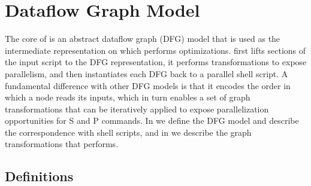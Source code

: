 \documentclass[letterpaper,twocolumn,10pt]{article}
\newcommand{\tcn}[1]{\mbox{\textcircled{\scriptsize #1}}}
\newcommand{\tsta}{\tcn{\textsc{S}}\xspace}
\newcommand{\tpur}{\tcn{\textsc{P}}\xspace}
\newcommand{\nv}[1]{[{\color{cyan}nv: #1}]}
\newcommand{\kk}[1]{[{\color{magenta}kk: #1}]}
\begin{document}
\section{Dataflow Graph Model}
\label{ir}

The core of \sys is an abstract dataflow graph (DFG) model that is used as the intermediate representation on which \sys performs optimizations.
\sys first lifts sections of the input script to the DFG
representation, it performs transformations to expose parallelism, and
then instantiates each DFG back to a parallel shell script.  A
fundamental difference with other DFG models is that it encodes the
order in which a node reads its inputs, which in turn enables a set of
graph transformations that can be iteratively applied to expose
parallelization opportunities for \tsta and \tpur commands.
In  we define the DFG model and describe the
correspondence with shell scripts, and in  we
describe the graph transformations that \sys performs.




\subsection{Definitions}
\label{graph-components}
\end{document}

